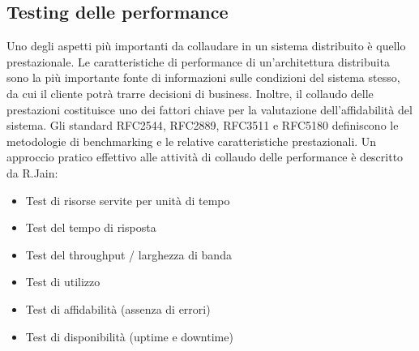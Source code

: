 \subsection{Testing delle performance}
Uno degli aspetti più importanti da collaudare in un sistema distribuito è quello prestazionale.
Le caratteristiche di performance di un'architettura distribuita sono la più importante fonte di informazioni sulle condizioni del sistema stesso, da cui il cliente potrà trarre decisioni di business.\cite{disttest}
Inoltre, il collaudo delle prestazioni costituisce uno dei fattori chiave per la valutazione dell'affidabilità del sistema.
Gli standard RFC2544\cite{rfc2544}, RFC2889\cite{rfc2889}, RFC3511\cite{rfc3511} e RFC5180\cite{rfc5180} definiscono le metodologie di benchmarking e le relative caratteristiche prestazionali.\cite{disttest}
Un approccio pratico effettivo alle attività di collaudo delle performance è descritto da R.Jain\cite{disttestJain}:
\begin{itemize}
\item Test di risorse servite per unità di tempo
\item Test del tempo di risposta
\item Test del throughput / larghezza di banda
\item Test di utilizzo
\item Test di affidabilità (assenza di errori)
\item Test di disponibilità (uptime e downtime)
\end{itemize}

